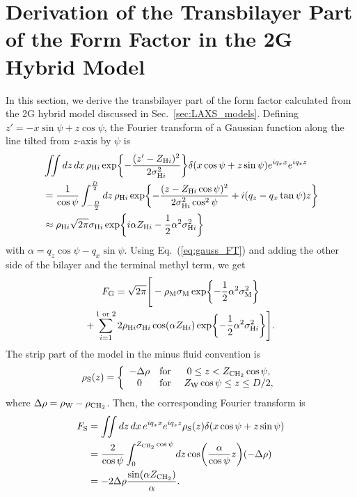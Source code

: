 \newpage
\section{Derivation of the Transbilayer Part of the Form Factor in the 2G Hybrid Model}\label{app:FT}
In this section, we derive the transbilayer part of the form factor calculated
from the 2G hybrid model discussed in Sec.~\ref{sec:LAXS_models}.
Defining $z'=-x\sin\psi+z\cos\psi$, the Fourier transform of a Gaussian function 
along the line tilted from $z$-axis by $\psi$ is
\begin{align}
  & \iint\mathop{dz}\mathop{dx} \rho_{\mathrm{H}i} \exp\mathopen{}\left\lbrace -\frac{(z'-Z_{\mathrm{H}i})^2}{2\sigma_{\mathrm{H}i}^2} \right\rbrace\mathclose{}
  \delta(x\cos\psi+z\sin\psi)e^{iq_xx}e^{iq_zz} \nonumber\\
  &= \frac{1}{\cos\psi}\int_{-\frac{D}{2}}^{\frac{D}{2}}\mathop{dz} \rho_{\mathrm{H}i} \exp\mathopen{}\left\lbrace 
    -\frac{(z-Z_{\mathrm{H}i}\cos\psi)^2}{2\sigma_{\mathrm{H}i}^2\cos^2\psi} + i(q_z-q_x\tan\psi)z
   \right\rbrace\mathclose{} \nonumber \\
  &\approx \rho_{\mathrm{H}i}\sqrt{2\pi}\sigma_{\mathrm{H}i} \,\mathrm{exp}
  \mathopen{}\left\lbrace 
    i\alpha Z_{\mathrm{H}i} - \frac{1}{2}\alpha^2\sigma_{\mathrm{H}i}^2
   \right\rbrace\mathclose{} \label{eq:gauss_FT}
\end{align}
with $\alpha=q_z\cos\psi-q_x\sin\psi$.
Using Eq.~(\ref{eq:gauss_FT}) and adding the other side of the bilayer and
the terminal methyl term, we get
\begin{multline}
  F_\mathrm{G} = \sqrt{2\pi}
  \Bigg[
    -\rho_\mathrm{M}\sigma_\mathrm{M} \exp\mathopen{}\left\lbrace 
      -\frac{1}{2}\alpha^2\sigma_\mathrm{M}^2
     \right\rbrace\mathclose{} \\
    + \sum_{i=1}^{1\text{ or }2}2\rho_{\mathrm{H}i}\sigma_{\mathrm{H}i}
    \cos(\alpha Z_{\mathrm{H}i})
    \,\mathrm{exp}\mathopen{}\left\lbrace -\frac{1}{2}\alpha^2\sigma_{\mathrm{H}i}^2 \right\rbrace\mathclose{}
  \Bigg].
\end{multline}
The strip part of the 
model in the minus fluid convention is
\begin{equation}
  \rho_\mathrm{S}(z) = \left\{
    \begin{array}{ccc}
      -\Delta\rho & \text{for } & 0 \leq z < Z_\mathrm{CH_2}\cos\psi, \\
      0   & \text{for } & Z_\mathrm{W}\cos\psi \leq z \leq D/2,
    \end{array}
  \right.
\end{equation}
where $\Delta\rho=\rho_\mathrm{W}-\rho_\mathrm{CH_2}$.
Then, the corresponding Fourier transform is 
\begin{align}
  F_\mathrm{S} 
  &= \iint\mathop{dz}\mathop{dx} e^{iq_xx}e^{iq_zz} \rho_\mathrm{S}(z)\delta(x\cos\psi+z\sin\psi) \nonumber\\
  &= \frac{2}{\cos\psi} \int_0^{Z_\mathrm{CH_2}\cos\psi}\mathop{dz}\cos\mathopen{}\left( \frac{\alpha}{\cos\psi} z \right)\mathclose{}(-\Delta\rho) \nonumber\\
  &= -2\Delta\rho\frac{\sin(\alpha Z_\mathrm{CH_2})}{\alpha}.
\end{align} 
